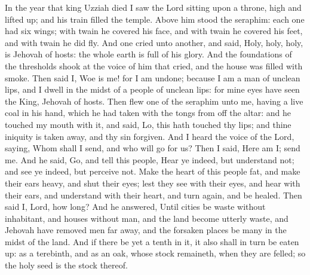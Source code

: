 In the year that king Uzziah died I saw the Lord sitting upon a throne, high and lifted up; and his train filled the temple. Above him stood the seraphim: each one had six wings; with twain he covered his face, and with twain he covered his feet, and with twain he did fly. And one cried unto another, and said, Holy, holy, holy, is Jehovah of hosts: the whole earth is full of his glory. And the foundations of the thresholds shook at the voice of him that cried, and the house was filled with smoke. Then said I, Woe is me! for I am undone; because I am a man of unclean lips, and I dwell in the midst of a people of unclean lips: for mine eyes have seen the King, Jehovah of hosts.  Then flew one of the seraphim unto me, having a live coal in his hand, which he had taken with the tongs from off the altar: and he touched my mouth with it, and said, Lo, this hath touched thy lips; and thine iniquity is taken away, and thy sin forgiven. And I heard the voice of the Lord, saying, Whom shall I send, and who will go for us? Then I said, Here am I; send me. And he said, Go, and tell this people, Hear ye indeed, but understand not; and see ye indeed, but perceive not. Make the heart of this people fat, and make their ears heavy, and shut their eyes; lest they see with their eyes, and hear with their ears, and understand with their heart, and turn again, and be healed. Then said I, Lord, how long? And he answered, Until cities be waste without inhabitant, and houses without man, and the land become utterly waste, and Jehovah have removed men far away, and the forsaken places be many in the midst of the land. And if there be yet a tenth in it, it also shall in turn be eaten up: as a terebinth, and as an oak, whose stock remaineth, when they are felled; so the holy seed is the stock thereof. 

